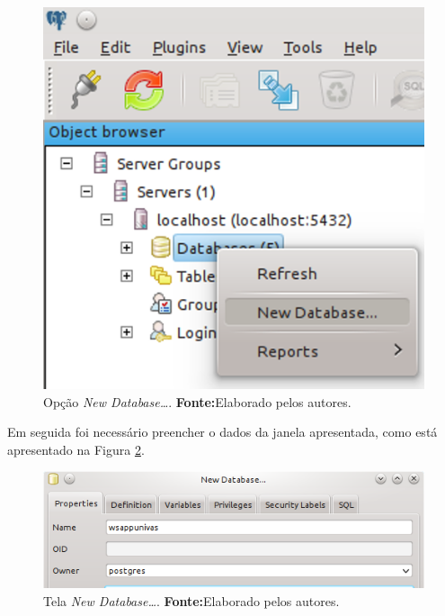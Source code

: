	\begin{figure}[h!]
		\centerline{\includegraphics[scale=0.5]{./imagens/2_q_metodologico/4_procedimentos_resultados/43_webservice/432_desenvolvimento/desws1.png}}
		\caption[Opção \textit{New Database\ldots}]{Opção \textit{New Database\ldots}.
			\textbf{Fonte:}Elaborado pelos autores.}
		\label{fig:desws1}
	\end{figure}

	\pagebreak
	
	\par Em seguida foi necessário preencher o dados da janela apresentada, como
está apresentado na Figura \ref{fig:desws2}.
	
	\begin{figure}[h!]
		\centerline{\includegraphics[scale=0.7]{./imagens/2_q_metodologico/4_procedimentos_resultados/43_webservice/432_desenvolvimento/desws2.png}}
		\caption[Tela \textit{New Database\ldots}]{Tela \textit{New Database\ldots}.
			\textbf{Fonte:}Elaborado pelos autores.}
		\label{fig:desws2}
	\end{figure}

